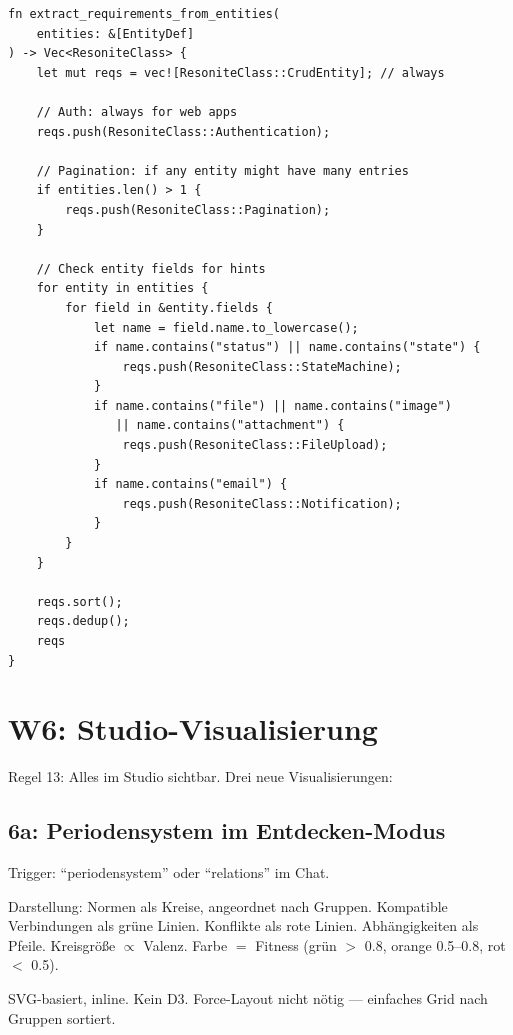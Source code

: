 \documentclass[11pt,a4paper]{article}
\begin{document}
\begin{lstlisting}[style=rust]
fn extract_requirements_from_entities(
    entities: &[EntityDef]
) -> Vec<ResoniteClass> {
    let mut reqs = vec![ResoniteClass::CrudEntity]; // always
    
    // Auth: always for web apps
    reqs.push(ResoniteClass::Authentication);
    
    // Pagination: if any entity might have many entries
    if entities.len() > 1 {
        reqs.push(ResoniteClass::Pagination);
    }
    
    // Check entity fields for hints
    for entity in entities {
        for field in &entity.fields {
            let name = field.name.to_lowercase();
            if name.contains("status") || name.contains("state") {
                reqs.push(ResoniteClass::StateMachine);
            }
            if name.contains("file") || name.contains("image") 
               || name.contains("attachment") {
                reqs.push(ResoniteClass::FileUpload);
            }
            if name.contains("email") {
                reqs.push(ResoniteClass::Notification);
            }
        }
    }
    
    reqs.sort();
    reqs.dedup();
    reqs
}
\end{lstlisting}

\section{W6: Studio-Visualisierung}
\label{sec:w6}

Regel 13: Alles im Studio sichtbar. Drei neue Visualisierungen:

\subsection{6a: Periodensystem im Entdecken-Modus}

Trigger: ``periodensystem'' oder ``relations'' im Chat.

Darstellung: Normen als Kreise, angeordnet nach Gruppen. Kompatible Verbindungen als gr\"une Linien. Konflikte als rote Linien. Abh\"angigkeiten als Pfeile. Kreisgr\"o{\ss}e $\propto$ Valenz. Farbe $=$ Fitness (gr\"un $>$ 0.8, orange 0.5--0.8, rot $<$ 0.5).

SVG-basiert, inline. Kein D3. Force-Layout nicht n\"otig --- einfaches Grid nach Gruppen sortiert.
\end{document}
